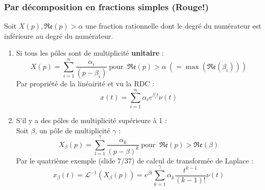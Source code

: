 		\subsubsection{Par décomposition en fractions simples (Rouge!)}
		Soit $X(p), \mathfrak{Re}(p) > \alpha$ une fraction rationnelle dont le degré du 
		numérateur est inférieure au degré du numérateur.
		\begin{enumerate}
		\item Si tous les pôles sont de multiplicité \textbf{unitaire} : 
		\begin{equation}
		X(p) = \sum_{i=1}^n \dfrac{\alpha_i}{(p-\beta_i)}\ \text{pour }\ \mathfrak{Re}(p) >
		\alpha\ (=\max(\mathfrak{Re}(\beta_i)))
		\end{equation}
		Par propriété de la linéairité et vu la RDC :
		\begin{equation}
		x(t) = \sum_{i=1}^n \alpha_i e^{\beta_it}\nu(t)
		\label{eq:Sl8}
		\end{equation}
		\item S'il y a des pôles de multiplicité supérieure à 1 :\\
		Soit $\beta$, un pôle de multiplicité $\gamma$ :
		\begin{equation}
		X_\beta(p) = \sum_{l=1}^\gamma \dfrac{\alpha_k}{(p-\beta)^k}\ \text{pour }\ \mathfrak{Re}(p) >
		\mathfrak{Re}(\beta)
		\end{equation}
		Par le quatrième exemple (slide 7/37) de calcul de transformée de Laplace :
		\begin{equation}
		x_\beta(t) = \mathcal{L}^{-1}(X_\beta(p)) = e^{\beta t}\sum_{k=1}^\gamma \alpha_k
		\dfrac{t^{k-1}}{(k-1)!}\nu(t)
		\end{equation}
		\end{enumerate}


